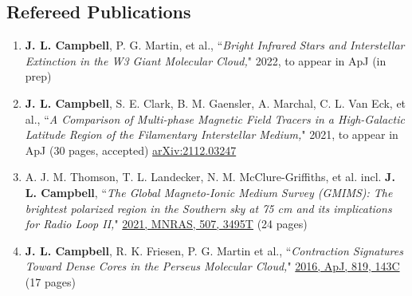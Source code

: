 \documentclass[10pt]{res} %
\begin{document}
\begin{resume}
\section{\Large Refereed Publications}
\vspace{-5pt} %
\noindent\makebox[\linewidth]{\rule{\textwidth}{0.4pt}}
\vspace{-15pt} %

\begin{enumerate}[{start=4,label=\arabic*.\addtocounter{enumi}{-2}}]
\itemsep-1em 
	\item \textbf{J. L. Campbell}, P. G. Martin, et al., ``\textit{Bright Infrared Stars and Interstellar Extinction in the W3 Giant Molecular Cloud,}" 2022, to appear in ApJ (in prep) \\
	\item \textbf{J. L. Campbell}, S. E. Clark, B. M. Gaensler, A. Marchal, C. L. Van Eck, et al., ``\textit{A Comparison of Multi-phase Magnetic Field Tracers in a High-Galactic Latitude Region of the Filamentary Interstellar Medium,}" 2021, to appear in ApJ (30 pages, accepted) \href{https://ui.adsabs.harvard.edu/abs/2021arXiv211203247C/abstract}{arXiv:2112.03247}  \\
	\item A. J. M. Thomson, T. L. Landecker, N. M. McClure-Griffiths, et al. incl. \textbf{J. L. Campbell}, ``\textit{The Global Magneto-Ionic Medium Survey (GMIMS): The brightest polarized region in the Southern sky at 75 cm and its implications for Radio Loop II,}" \href{https://ui.adsabs.harvard.edu/abs/2021arXiv210612595T/abstract}{2021, MNRAS, 507, 3495T} (24 pages) \\
	\item \textbf{J. L. Campbell}, R. K. Friesen, P. G. Martin et al., ``\textit{Contraction Signatures Toward Dense Cores in the Perseus Molecular Cloud,}" \href{https://ui.adsabs.harvard.edu/abs/2016ApJ...819..143C/abstract}{2016, ApJ, 819, 143C} (17 pages)
\end{enumerate}



\end{resume}
\end{document}
